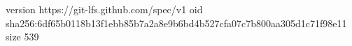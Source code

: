 version https://git-lfs.github.com/spec/v1
oid sha256:6df65b0118b13f1ebb85b7a2a8e9b6bd4b527cfa07c7b800aa305d1c71f98e11
size 539
